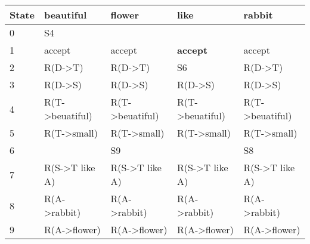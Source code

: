 \begin{center}
\begin{latin}
\begin{tabular}{|l|l|l|l|l|}
\hline
State & beautiful                    & flower                       & like                         & rabbit                       \\ \hline
0     & S4                           &                              &                              &                              \\ \hline
1     & accept                       & accept                       & \textbf{accept}              & accept                       \\ \hline
2     & R(D-\textgreater{}T)         & R(D-\textgreater{}T)         & S6                           & R(D-\textgreater{}T)         \\ \hline
3     & R(D-\textgreater{}S)         & R(D-\textgreater{}S)         & R(D-\textgreater{}S)         & R(D-\textgreater{}S)         \\ \hline
4     & R(T-\textgreater{}beuatiful) & R(T-\textgreater{}beuatiful) & R(T-\textgreater{}beuatiful) & R(T-\textgreater{}beuatiful) \\ \hline
5     & R(T-\textgreater{}small)     & R(T-\textgreater{}small)     & R(T-\textgreater{}small)     & R(T-\textgreater{}small)     \\ \hline
6     &                              & S9                           &                              & S8                           \\ \hline
7     & R(S-\textgreater{}T like A)  & R(S-\textgreater{}T like A)  & R(S-\textgreater{}T like A)  & R(S-\textgreater{}T like A)  \\ \hline
8     & R(A-\textgreater{}rabbit)    & R(A-\textgreater{}rabbit)    & R(A-\textgreater{}rabbit)    & R(A-\textgreater{}rabbit)    \\ \hline
9     & R(A-\textgreater{}flower)    & R(A-\textgreater{}flower)    & R(A-\textgreater{}flower)    & R(A-\textgreater{}flower)    \\ \hline
\end{tabular}


\end{latin}
\end{center}
